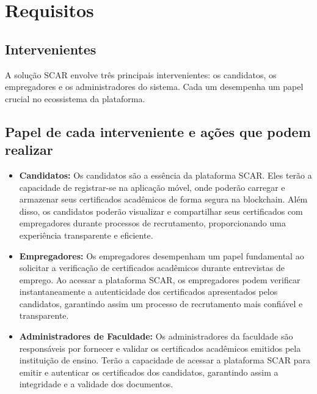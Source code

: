 \documentclass[10pt]{article}
\begin{document}
\section{Requisitos}

\subsection*{Intervenientes}

A solução SCAR envolve três principais intervenientes: os candidatos, os empregadores e os administradores
do sistema. Cada um desempenha um papel crucial no ecossistema da plataforma.

\subsection*{Papel de cada interveniente e ações que podem realizar}

\begin{itemize}

    \item \textbf{Candidatos:} Os candidatos são a essência da plataforma SCAR. Eles terão a capacidade de registrar-se na
          aplicação móvel, onde poderão carregar e armazenar seus certificados acadêmicos de forma segura na blockchain.
          Além disso, os candidatos poderão visualizar e compartilhar seus certificados com empregadores durante processos
          de recrutamento, proporcionando uma experiência transparente e eficiente.

    \item \textbf{Empregadores:} Os empregadores desempenham um papel fundamental ao solicitar a verificação de certificados
          acadêmicos durante entrevistas de emprego. Ao acessar a plataforma SCAR, os empregadores podem verificar
          instantaneamente a autenticidade dos certificados apresentados pelos candidatos, garantindo assim um processo
          de recrutamento mais confiável e transparente.

    \item \textbf{Administradores de Faculdade:} Os administradores da faculdade são responsáveis por fornecer e validar
     os certificados acadêmicos emitidos pela instituição de ensino. Terão a capacidade de acessar a plataforma SCAR
      para emitir e autenticar os certificados dos candidatos, garantindo assim a integridade e a validade dos documentos.

\end{itemize}
\end{document}
